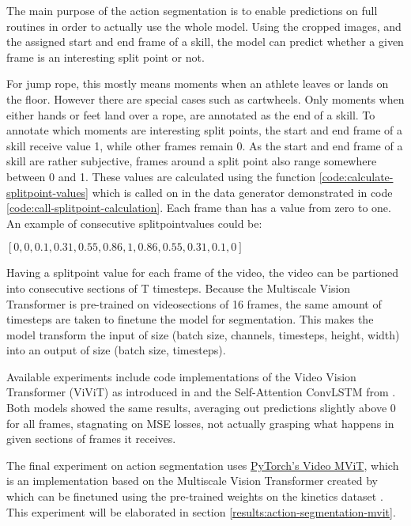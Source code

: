 The main purpose of the action segmentation is to enable predictions on full routines in order to actually use the whole model. Using the cropped images, and the assigned start and end frame of a skill, the model can predict whether a given frame is an interesting split point or not.

For jump rope, this mostly means moments when an athlete leaves or lands on the floor. However there are special cases such as cartwheels. Only moments when either hands or feet land over a rope, are annotated as the end of a skill. 
To annotate which moments are interesting split points, the start and end frame of a skill receive value 1, while other frames remain 0.
As the start and end frame of a skill are rather subjective, frames around a split point also range somewhere between 0 and 1. These values are calculated using the function \ref{code:calculate-splitpoint-values} which is called on in the data generator demonstrated in code \ref{code:call-splitpoint-calculation}.
Each frame than has a value from zero to one. An example of consecutive splitpointvalues could be:

\([0, 0, 0.1, 0.31, 0.55, 0.86, 1, 0.86, 0.55, 0.31, 0.1, 0]\)

Having a splitpoint value for each frame of the video, the video can be partioned into consecutive sections of T timesteps. Because the Multiscale Vision Transformer is pre-trained on videosections of 16 frames, the same amount of timesteps are taken to finetune the model for segmentation. This makes the model transform the input of size (batch size, channels, timesteps, height, width) into an output of size (batch size, timesteps).

Available experiments include code implementations of the Video Vision Transformer (ViViT) as introduced in \textcite{Arnab2021} and the Self-Attention ConvLSTM from \textcite{Lin_2020}. Both models showed the same results, averaging out predictions slightly above 0 for all frames, stagnating on MSE losses, not actually grasping what happens in given sections of frames it receives.

The final experiment on action segmentation uses \href{https://pytorch.org/vision/main/models/video_mvit.html}{PyTorch's Video MViT}, which is an implementation based on the Multiscale Vision Transformer created by \textcite{Fan2021} which can be finetuned using the pre-trained weights on the kinetics dataset \autocite{Kay2017}. This experiment will be elaborated in section \ref{results:action-segmentation-mvit}.


